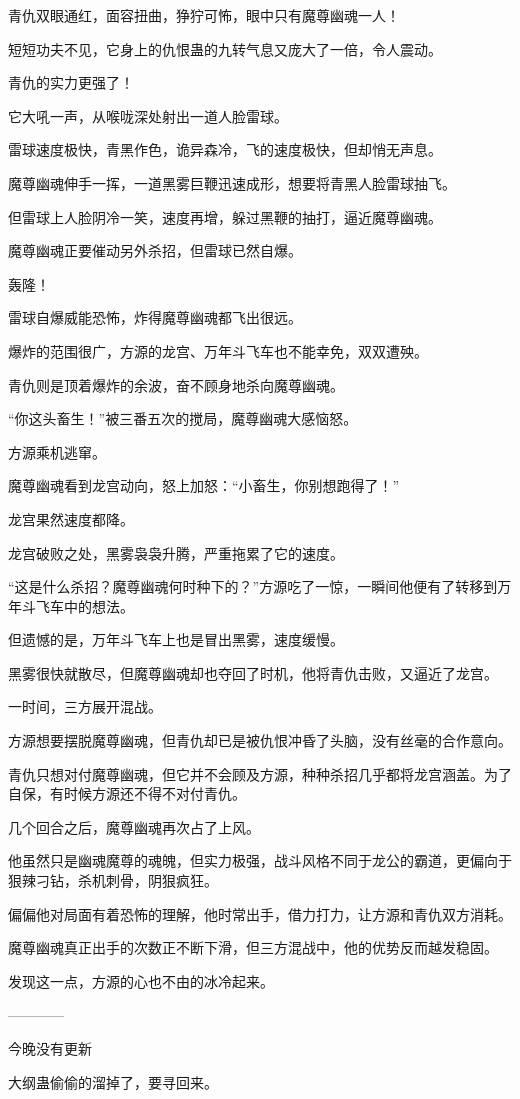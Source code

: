 \begin{this_body}
青仇双眼通红，面容扭曲，狰狞可怖，眼中只有魔尊幽魂一人！

短短功夫不见，它身上的仇恨蛊的九转气息又庞大了一倍，令人震动。

青仇的实力更强了！

它大吼一声，从喉咙深处射出一道人脸雷球。

雷球速度极快，青黑作色，诡异森冷，飞的速度极快，但却悄无声息。

魔尊幽魂伸手一挥，一道黑雾巨鞭迅速成形，想要将青黑人脸雷球抽飞。

但雷球上人脸阴冷一笑，速度再增，躲过黑鞭的抽打，逼近魔尊幽魂。

魔尊幽魂正要催动另外杀招，但雷球已然自爆。

轰隆！

雷球自爆威能恐怖，炸得魔尊幽魂都飞出很远。

爆炸的范围很广，方源的龙宫、万年斗飞车也不能幸免，双双遭殃。

青仇则是顶着爆炸的余波，奋不顾身地杀向魔尊幽魂。

“你这头畜生！”被三番五次的搅局，魔尊幽魂大感恼怒。

方源乘机逃窜。

魔尊幽魂看到龙宫动向，怒上加怒：“小畜生，你别想跑得了！”

龙宫果然速度都降。

龙宫破败之处，黑雾袅袅升腾，严重拖累了它的速度。

“这是什么杀招？魔尊幽魂何时种下的？”方源吃了一惊，一瞬间他便有了转移到万年斗飞车中的想法。

但遗憾的是，万年斗飞车上也是冒出黑雾，速度缓慢。

黑雾很快就散尽，但魔尊幽魂却也夺回了时机，他将青仇击败，又逼近了龙宫。

一时间，三方展开混战。

方源想要摆脱魔尊幽魂，但青仇却已是被仇恨冲昏了头脑，没有丝毫的合作意向。

青仇只想对付魔尊幽魂，但它并不会顾及方源，种种杀招几乎都将龙宫涵盖。为了自保，有时候方源还不得不对付青仇。

几个回合之后，魔尊幽魂再次占了上风。

他虽然只是幽魂魔尊的魂魄，但实力极强，战斗风格不同于龙公的霸道，更偏向于狠辣刁钻，杀机刺骨，阴狠疯狂。

偏偏他对局面有着恐怖的理解，他时常出手，借力打力，让方源和青仇双方消耗。

魔尊幽魂真正出手的次数正不断下滑，但三方混战中，他的优势反而越发稳固。

发现这一点，方源的心也不由的冰冷起来。

------------

今晚没有更新

大纲蛊偷偷的溜掉了，要寻回来。

\end{this_body}

